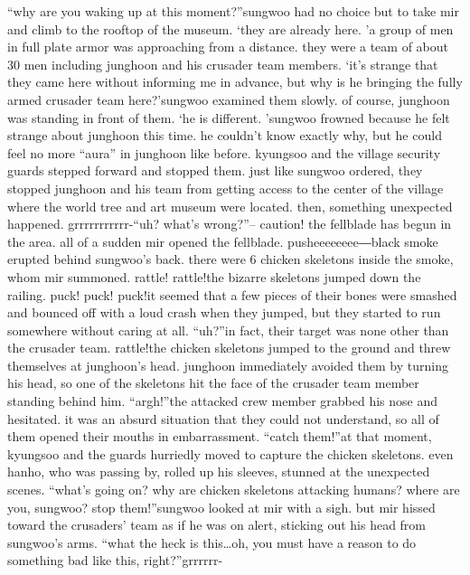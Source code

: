 “why are you waking up at this moment?”sungwoo had no choice but to take mir and climb to the rooftop of the museum.
‘they are already here.
’a group of men in full plate armor was approaching from a distance.
 they were a team of about 30 men including junghoon and his crusader team members.
‘it’s strange that they came here without informing me in advance, but why is he bringing the fully armed crusader team here?’sungwoo examined them slowly.
 of course, junghoon was standing in front of them.
‘he is different.
’sungwoo frowned because he felt strange about junghoon this time.
 he couldn’t know exactly why, but he could feel no more “aura” in junghoon like before.
kyungsoo and the village security guards stepped forward and stopped them.
 just like sungwoo ordered, they stopped junghoon and his team from getting access to the center of the village where the world tree and art museum were located.
then, something unexpected happened.
grrrrrrrrrrr-“uh? what’s wrong?”– caution! the fellblade has begun in the area.
all of a sudden mir opened the fellblade.
pusheeeeeeee―black smoke erupted behind sungwoo’s back.
 there were 6 chicken skeletons inside the smoke, whom mir summoned.
rattle! rattle!the bizarre skeletons jumped down the railing.
puck! puck! puck!it seemed that a few pieces of their bones were smashed and bounced off with a loud crash when they jumped, but they started to run somewhere without caring at all.
“uh?”in fact, their target was none other than the crusader team.
rattle!the chicken skeletons jumped to the ground and threw themselves at junghoon’s head.
junghoon immediately avoided them by turning his head, so one of the skeletons hit the face of the crusader team member standing behind him.
“argh!”the attacked crew member grabbed his nose and hesitated.
 it was an absurd situation that they could not understand, so all of them opened their mouths in embarrassment.
“catch them!”at that moment, kyungsoo and the guards hurriedly moved to capture the chicken skeletons.
 even hanho, who was passing by, rolled up his sleeves, stunned at the unexpected scenes.
“what’s going on? why are chicken skeletons attacking humans? where are you, sungwoo? stop them!”sungwoo looked at mir with a sigh.
 but mir hissed toward the crusaders’ team as if he was on alert, sticking out his head from sungwoo’s arms.
“what the heck is this…oh, you must have a reason to do something bad like this, right?”grrrrrr-

